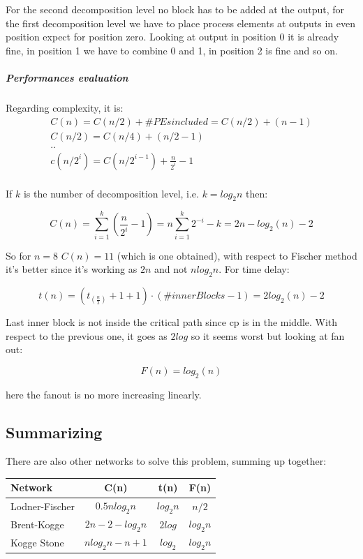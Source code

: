 For the second decomposition level no block has to be added at the output, for the first decomposition level we have to place process elements at outputs in even position expect for position zero. Looking at output in position 0 it is already fine, in position 1 we have to combine 0 and 1, in position 2 is fine and so on.

\subparagraph{Performances evaluation}
Regarding complexity, it is:
\begin{eqnarray}
C(n)=C(n/2)+ \#PEs included= C(n/2)+ (n-1)\\
C(n/2)=C(n/4)+(n/2 - 1)\\
..\\
c(n/2^i)=C(n/2^{i-1})+ \frac{n}{2^i}-1\\
\end{eqnarray}

If $k$ is the number of decomposition level, i.e. $k=log_2 n$ then:

$$C(n)=\sum_{i=1}^{k}(\frac{n}{2^i}-1)= n \sum_{i=1}^{k} 2^{-i}-k= 2n-log_2( n) - 2$$

So for $n=8$ $C(n)=11$ (which is one obtained), with respect to Fischer method it's better since it's working as $2n$ and not $nlog_2 n$. For time delay:

$$t(n)=(t_(\frac{n}{2}) + 1 + 1) \cdot (\#innerBlocks -1) = 2log_2 (n) -2$$

Last inner block is not inside the critical path since cp is in the middle. With respect to the previous one, it goes as $2 log$ so it seems worst but looking at fan out:

$$F(n)=log_2 (n)$$

here the fanout is no more increasing linearly.


\subsection{Summarizing}
There are also other networks to solve this problem, summing up together:

\begin{center}
  \begin{tabular}{|l|c|c|c|}
    \hline
    Network&      C(n)&     t(n)&     F(n)\\
    \hline
    Lodner-Fischer&   $0.5nlog_2n$&   $log_2n$&   $n/2$\\
    Brent-Kogge &   $2n-2-log_2n$&    $2log$&     $log_2 n$\\
    Kogge Stone &   $nlog_2n - n+1$&   $log_2$&     $log_2 n$\\
    \hline
  \end{tabular}
\end{center}


